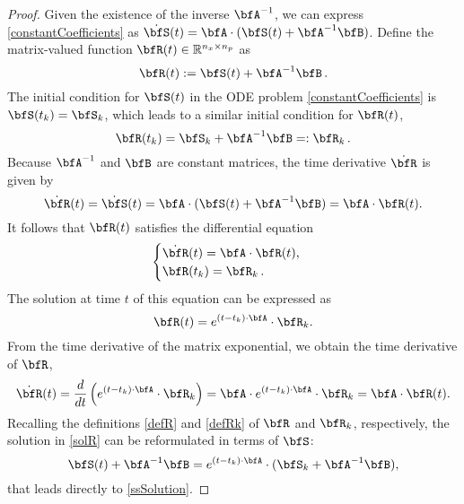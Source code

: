 \documentclass[DIV=12]{scrartcl} %
\theoremstyle{definition}
\begin{document}
\begin{proof}
    Given the existence of the inverse $\bfA^{-1}$, we can express \eqref{constantCoefficients} as $\dot{\bfS}(t) = \bfA\cdot (\bfS(t) + \bfA^{-1}\bfB)$. Define the matrix-valued function $\bfR(t)\in\mathbb{R}^{n_x\times n_p}$ as 
    \begin{equation}
    \label{defR}
        \bfR(t):=\bfS(t) + \bfA^{-1}\bfB\,.
    \end{equation}  
    The initial condition for $\bfS(t)$ in the ODE problem \eqref{constantCoefficients} is $\bfS(t_k)=\bfS_k$, which leads to a similar initial condition for $\bfR(t)$, 
    \begin{equation}
    \label{defRk}
    \bfR(t_k) = \bfS_k+\bfA^{-1}\bfB=:\bfR_k\,.
    \end{equation}
    Because $\bfA^{-1}$ and $\bfB$ are constant matrices, the time derivative $\dot{\bfR}$ is given by
    \[
    \dot{\bfR}(t)=\dot{\bfS}(t)=\bfA\cdot (\bfS(t) + \bfA^{-1}\bfB)=\bfA\cdot \bfR(t).
    \] 
    It follows that $\bfR(t)$ satisfies the differential equation
    \begin{equation*}
        \begin{cases}
        \dot{\bfR}(t)=\bfA\cdot \bfR(t),\\
        \bfR(t_k)=\bfR_k\,.
        \end{cases}
    \end{equation*}
    The solution at time $t$ of this equation can be expressed as
    \begin{equation}
    \label{solR}
        \bfR(t) = e^{(t-t_k)\cdot \bfA}\cdot \bfR_k.
    \end{equation}
     From the time derivative of the matrix exponential, we obtain the time derivative of $\bfR$,
    \[
    \dot{\bfR}(t)=\frac{d }{dt}\left(e^{(t-t_k)\cdot \bfA}\cdot \bfR_k\right)=\bfA\cdot e^{(t-t_k)\cdot \bfA}\cdot \bfR_k = \bfA\cdot \bfR(t).
    \]
    Recalling the definitions \eqref{defR} and \eqref{defRk} of $\bfR$ and $\bfR_k$, respectively, the solution in \eqref{solR} can be reformulated in terms of $\bfS$: 
    \[
    \bfS(t) + \bfA^{-1}\bfB = e^{(t-t_k)\cdot \bfA}\cdot (\bfS_k+\bfA^{-1}\bfB),
    \]
    that leads directly to \eqref{ssSolution}.
\end{proof}
\end{document}
